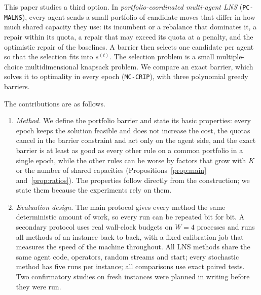 \documentclass[a4paper,fleqn]{cas-sc}
\newcommand{\pcm}{\texttt{PC-MALNS}}
\newcommand{\mcc}{\texttt{MC-CRIP}}
\begin{document}
This paper studies a third option. In \emph{portfolio-coordinated multi-agent LNS} (\pcm), every agent sends a small portfolio of candidate moves that differ in how much shared capacity they use: its incumbent or a rebalance that dominates it, a repair within its quota, a repair that may exceed its quota at a penalty, and the optimistic repair of the baselines. A barrier then selects one candidate per agent so that the selection fits into $s^{(t)}$. The selection problem is a small multiple-choice multidimensional knapsack problem. We compare an exact barrier, which solves it to optimality in every epoch (\mcc), with three polynomial greedy barriers.

The contributions are as follows.
\begin{enumerate}[noitemsep]
    \item \textit{Method.} We define the portfolio barrier and state its basic properties: every epoch keeps the solution feasible and does not increase the cost, the quotas cancel in the barrier constraint and act only on the agent side, and the exact barrier is at least as good as every other rule on a common portfolio in a single epoch, while the other rules can be worse by factors that grow with $K$ or the number of shared capacities (Propositions~\ref{prop:main} and~\ref{prop:ratios}). The properties follow directly from the construction; we state them because the experiments rely on them.
    \item \textit{Evaluation design.} The main protocol gives every method the same deterministic amount of work, so every run can be repeated bit for bit. A secondary protocol uses real wall-clock budgets on $W = 4$ processes and runs all methods of an instance back to back, with a fixed calibration job that measures the speed of the machine throughout. All LNS methods share the same agent code, operators, random streams and start; every stochastic method has five runs per instance; all comparisons use exact paired tests. Two confirmatory studies on fresh instances were planned in writing before they were run.

\end{enumerate}
\end{document}
